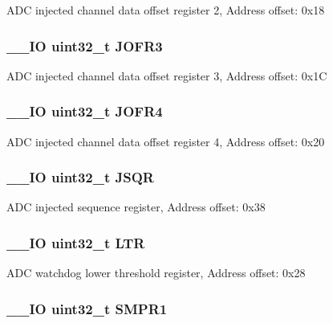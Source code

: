 A\-D\-C injected channel data offset register 2, Address offset\-: 0x18 \hypertarget{struct_a_d_c___type_def_a613f6b76d20c1a513976b920ecd7f4f8}{
\subsubsection[{J\-O\-F\-R3}]{\setlength{\rightskip}{0pt plus 5cm}\-\_\-\-\_\-\-I\-O uint32\-\_\-t J\-O\-F\-R3}}\label{struct_a_d_c___type_def_a613f6b76d20c1a513976b920ecd7f4f8}
A\-D\-C injected channel data offset register 3, Address offset\-: 0x1\-C \hypertarget{struct_a_d_c___type_def_a2fd59854223e38158b4138ee8e913ab3}{
\subsubsection[{J\-O\-F\-R4}]{\setlength{\rightskip}{0pt plus 5cm}\-\_\-\-\_\-\-I\-O uint32\-\_\-t J\-O\-F\-R4}}\label{struct_a_d_c___type_def_a2fd59854223e38158b4138ee8e913ab3}
A\-D\-C injected channel data offset register 4, Address offset\-: 0x20 \hypertarget{struct_a_d_c___type_def_a75e0cc079831adcc051df456737d3ae4}{
\subsubsection[{J\-S\-Q\-R}]{\setlength{\rightskip}{0pt plus 5cm}\-\_\-\-\_\-\-I\-O uint32\-\_\-t J\-S\-Q\-R}}\label{struct_a_d_c___type_def_a75e0cc079831adcc051df456737d3ae4}
A\-D\-C injected sequence register, Address offset\-: 0x38 \hypertarget{struct_a_d_c___type_def_a9f8712dfef7125c0bb39db11f2b7416b}{
\subsubsection[{L\-T\-R}]{\setlength{\rightskip}{0pt plus 5cm}\-\_\-\-\_\-\-I\-O uint32\-\_\-t L\-T\-R}}\label{struct_a_d_c___type_def_a9f8712dfef7125c0bb39db11f2b7416b}
A\-D\-C watchdog lower threshold register, Address offset\-: 0x28 \hypertarget{struct_a_d_c___type_def_af9d6c604e365c7d9d7601bf4ef373498}{
\subsubsection[{S\-M\-P\-R1}]{\setlength{\rightskip}{0pt plus 5cm}\-\_\-\-\_\-\-I\-O uint32\-\_\-t S\-M\-P\-R1}}\label{struct_a_d_c___type_def_af9d6c604e365c7d9d7601bf4ef373498}
